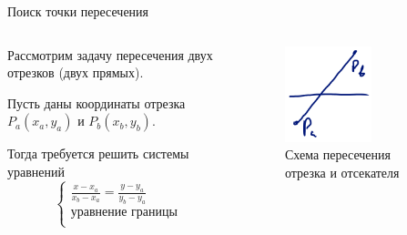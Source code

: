 \documentclass{beamer}
\begin{document}
	\begin{frame}{Поиск точки пересечения}

		\begin{columns}
			\begin{column}{0.5\textwidth}

				Рассмотрим задачу пересечения двух отрезков (двух прямых).
				
				Пусть даны координаты отрезка $P_a(x_a, y_a)$ и $P_b(x_b, y_b)$.

				Тогда требуется решить системы уравнений
				\[
					\begin{cases}
						\frac{x - x_a}{x_b - x_a} = \frac{y - y_a}{y_b - y_a}  \\
						\text{уравнение границы}	\\
					\end{cases}
				\]
				
			\end{column}
			\begin{column}{0.5\textwidth}
				\begin{figure} 
					\includegraphics[width=0.6\textwidth]{images/example2.png}
					\caption{Схема пересечения отрезка и отсекателя}
				\end{figure}
			\end{column}
		\end{columns}

\end{frame}
\end{document}

